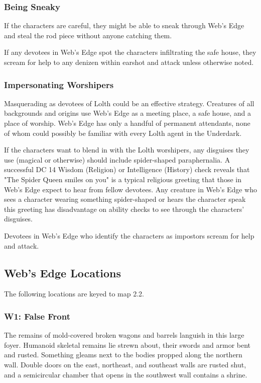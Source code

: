 \documentclass[10pt,a4paper,twoside,bg=print,twocolumn,openany,nodeprecatedcode]{dndbook}
\begin{document}
\subsubsection{Being Sneaky}
If the characters are careful, they might be able to sneak through Web's Edge and steal the rod piece without anyone catching them.

If any devotees in Web's Edge spot the characters infiltrating the safe house, they scream for help to any denizen within earshot and attack unless otherwise noted.

\subsubsection{Impersonating Worshipers}
Masquerading as devotees of Lolth could be an effective strategy. Creatures of all backgrounds and origins use Web's Edge as a meeting place, a safe house, and a place of worship. Web's Edge has only a handful of permanent attendants, none of whom could possibly be familiar with every Lolth agent in the Underdark.

If the characters want to blend in with the Lolth worshipers, any disguises they use (magical or otherwise) should include spider-shaped paraphernalia. A successful DC 14 Wisdom (Religion) or Intelligence (History) check reveals that "The Spider Queen smiles on you" is a typical religious greeting that those in Web's Edge expect to hear from fellow devotees. Any creature in Web's Edge who sees a character wearing something spider-shaped or hears the character speak this greeting has disadvantage on ability checks to see through the characters' disguises.

Devotees in Web's Edge who identify the characters as impostors scream for help and attack.

\subsection{Web's Edge Locations}
The following locations are keyed to map 2.2.

\subsubsection{W1: False Front}
\begin{DndReadAloud}{}
The remains of mold-covered broken wagons and barrels languish in this large foyer. Humanoid skeletal remains lie strewn about, their swords and armor bent and rusted. Something gleams next to the bodies propped along the northern wall. Double doors on the east, northeast, and southeast walls are rusted shut, and a semicircular chamber that opens in the southwest wall contains a shrine.

\end{DndReadAloud}
\end{document}
